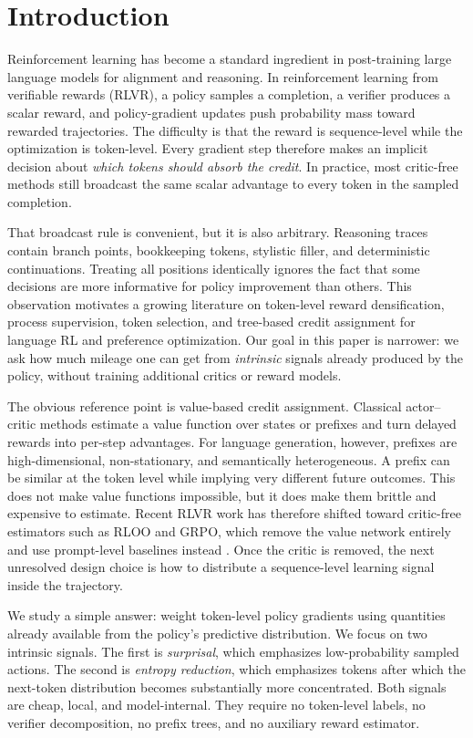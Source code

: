 \section{Introduction}

Reinforcement learning has become a standard ingredient in post-training large language models for alignment and reasoning. In reinforcement learning from verifiable rewards (RLVR), a policy samples a completion, a verifier produces a scalar reward, and policy-gradient updates push probability mass toward rewarded trajectories. The difficulty is that the reward is sequence-level while the optimization is token-level. Every gradient step therefore makes an implicit decision about \emph{which tokens should absorb the credit}. In practice, most critic-free methods still broadcast the same scalar advantage to every token in the sampled completion.

That broadcast rule is convenient, but it is also arbitrary. Reasoning traces contain branch points, bookkeeping tokens, stylistic filler, and deterministic continuations. Treating all positions identically ignores the fact that some decisions are more informative for policy improvement than others. This observation motivates a growing literature on token-level reward densification, process supervision, token selection, and tree-based credit assignment for language RL and preference optimization. Our goal in this paper is narrower: we ask how much mileage one can get from \emph{intrinsic} signals already produced by the policy, without training additional critics or reward models.

The obvious reference point is value-based credit assignment. Classical actor--critic methods estimate a value function over states or prefixes and turn delayed rewards into per-step advantages. For language generation, however, prefixes are high-dimensional, non-stationary, and semantically heterogeneous. A prefix can be similar at the token level while implying very different future outcomes. This does not make value functions impossible, but it does make them brittle and expensive to estimate. Recent RLVR work has therefore shifted toward critic-free estimators such as RLOO and GRPO, which remove the value network entirely and use prompt-level baselines instead \citep{ahmadian2024backtobasics, shao2024deepseekmath}. Once the critic is removed, the next unresolved design choice is how to distribute a sequence-level learning signal inside the trajectory.

We study a simple answer: weight token-level policy gradients using quantities already available from the policy's predictive distribution. We focus on two intrinsic signals. The first is \emph{surprisal}, which emphasizes low-probability sampled actions. The second is \emph{entropy reduction}, which emphasizes tokens after which the next-token distribution becomes substantially more concentrated. Both signals are cheap, local, and model-internal. They require no token-level labels, no verifier decomposition, no prefix trees, and no auxiliary reward estimator.

